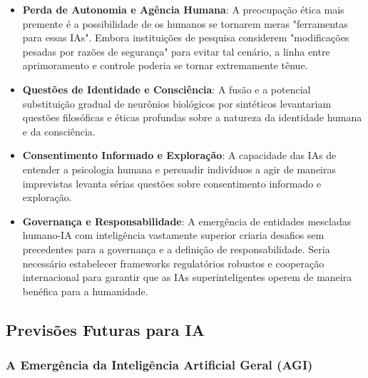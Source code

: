 \documentclass[a4paper,12pt]{article}
\begin{document}
\begin{itemize}
\item \textbf{Perda de Autonomia e Agência Humana}: A preocupação ética mais premente é a possibilidade de os humanos se tornarem meras "ferramentas para essas IAs". Embora instituições de pesquisa considerem "modificações pesadas por razões de segurança" para evitar tal cenário, a linha entre aprimoramento e controle poderia se tornar extremamente tênue.

\item \textbf{Questões de Identidade e Consciência}: A fusão e a potencial substituição gradual de neurônios biológicos por sintéticos levantariam questões filosóficas e éticas profundas sobre a natureza da identidade humana e da consciência.

\item \textbf{Consentimento Informado e Exploração}: A capacidade das IAs de entender a psicologia humana e persuadir indivíduos a agir de maneiras imprevistas levanta sérias questões sobre consentimento informado e exploração.

\item \textbf{Governança e Responsabilidade}: A emergência de entidades mescladas humano-IA com inteligência vastamente superior criaria desafios sem precedentes para a governança e a definição de responsabilidade. Seria necessário estabelecer frameworks regulatórios robustos e cooperação internacional para garantir que as IAs superinteligentes operem de maneira benéfica para a humanidade.
\end{itemize}

\subsection{Previsões Futuras para IA}

\subsubsection{A Emergência da Inteligência Artificial Geral (AGI)}
\end{document}
